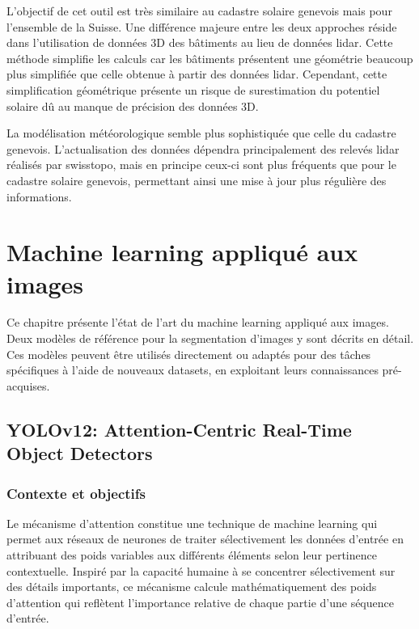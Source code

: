L'objectif de cet outil est très similaire au cadastre solaire genevois mais pour l'ensemble de la Suisse. Une différence majeure entre les deux approches réside dans l'utilisation de données 3D des bâtiments au lieu de données \gls{lidar}. Cette méthode simplifie les calculs car les bâtiments présentent une géométrie beaucoup plus simplifiée que celle obtenue à partir des données \gls{lidar}. Cependant, cette simplification géométrique présente un risque de surestimation du potentiel solaire dû au manque de précision des données 3D.

La modélisation météorologique semble plus sophistiquée que celle du cadastre genevois. L'actualisation des données dépendra principalement des relevés \gls{lidar} réalisés par swisstopo, mais en principe ceux-ci sont plus fréquents que pour le cadastre solaire genevois, permettant ainsi une mise à jour plus régulière des informations.

\section{Machine learning appliqué aux images}
Ce chapitre présente l'état de l'art du machine learning appliqué aux images. Deux modèles de référence pour la segmentation d'images y sont décrits en détail. Ces modèles peuvent être utilisés directement ou adaptés pour des tâches spécifiques à l'aide de nouveaux datasets, en exploitant leurs connaissances pré-acquises.

\subsection{YOLOv12: Attention-Centric Real-Time Object Detectors}
\label{subsec:yolov12_attention_centric}

\subsubsection{Contexte et objectifs}
Le mécanisme d'attention \cite{noauthor_what_2024} \cite{vaswani_attention_2023} constitue une technique de machine learning qui permet aux réseaux de neurones de traiter sélectivement les données d'entrée en attribuant des poids variables aux différents éléments selon leur pertinence contextuelle. Inspiré par la capacité humaine à se concentrer sélectivement sur des détails importants, ce mécanisme calcule mathématiquement des poids d'attention qui reflètent l'importance relative de chaque partie d'une séquence d'entrée.

